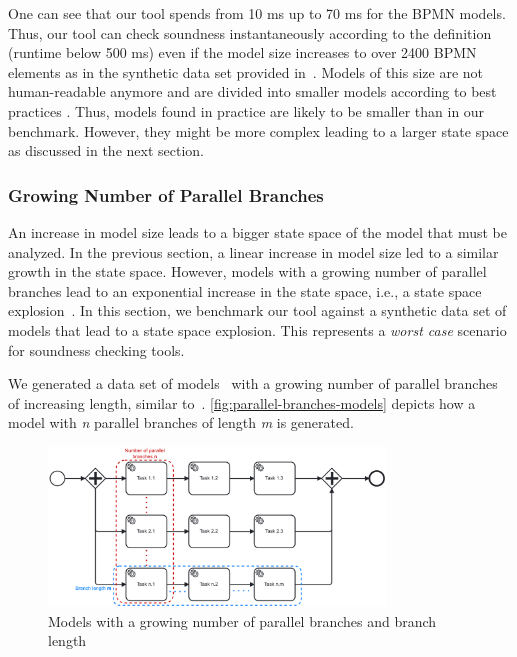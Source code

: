 \documentclass[runningheads]{llncs}
\begin{document}
One can see that our tool spends from 10 ms up to 70 ms for the BPMN models.
Thus, our tool can check soundness instantaneously according to the definition (runtime below 500 ms) even if the model size increases to over 2400 BPMN elements as in the synthetic data set provided in~\cite{krauterHigherorderTransformationApproach2023}.
Models of this size are not human-readable anymore and are divided into smaller models according to best practices \cite{fahlandAnalysisDemandInstantaneous2011}.
Thus, models found in practice are likely to be smaller than in our benchmark.
However, they might be more complex leading to a larger state space as discussed in the next section.

\subsubsection{Growing Number of Parallel Branches} \label{subsec:degrees-of-parallelism}
An increase in model size leads to a bigger state space of the model that must be analyzed.
In the previous section, a linear increase in model size led to a similar growth in the state space.
However, models with a growing number of parallel branches lead to an exponential increase in the state space, i.e., a state space explosion~\cite{valmariStateExplosionProblem1998}.
In this section, we benchmark our tool against a synthetic data set of models that lead to a state space explosion.
This represents a \textit{worst case} scenario for soundness checking tools.

We generated a data set of models~\cite{noauthorgivenBPM2024Artifacts2024} with a growing number of parallel branches of increasing length, similar to~\cite{corradiniFormalApproachAnalysis2021}.
\autoref{fig:parallel-branches-models} depicts how a model with \textit{n} parallel branches of length \textit{m} is generated.

\begin{figure}[ht]
	\centering
	\includegraphics[width=0.8\textwidth]{images/parallel-branches}
	\caption{Models with a growing number of parallel branches and branch length}
	\label{fig:parallel-branches-models}
\end{figure}
\end{document}
